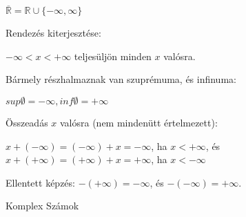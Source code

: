 \begin{frame}
\begin{tcolorbox}[title={Def.: Bővített valós számok (?)}]
  $\overline{\mathbb{R}} = \mathbb{R} \cup \{ -{\infty}, {\infty}\}$\\
  \mbigskip

  Rendezés kiterjesztése:\\
  \mmedskip
  
  $-{\infty} < x < +{\infty}$ teljesüljön minden $x$ valósra.\\
  \msmallskip
  
  Bármely részhalmaznak van szuprémuma, és infinuma:\\
  \msmallskip
  
  $sup{\emptyset} = -{\infty}, inf{\emptyset} = +{\infty}$\\
  \mmedskip

  Összeadás $x$ valósra (nem mindenütt értelmezett):\\
  \msmallskip
  
  $x + (-{\infty}) = (-{\infty}) + x = -{\infty}$, ha $x < +{\infty}$, és $x + (+{\infty}) = (+{\infty}) + x = +{\infty}$, ha $x < -{\infty}$\\
  \mmedskip

  Ellentett képzés: $-(+{\infty}) = -{\infty}$, és $-(-{\infty}) = +{\infty}$.
\end{tcolorbox}
\end{frame}


\begin{frame}
\begin{tcolorbox}
{\RHuge Komplex Számok}
\end{tcolorbox}
\end{frame}

